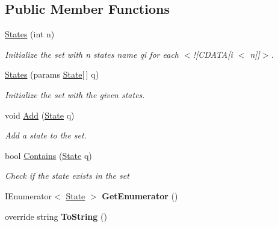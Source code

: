 \subsection*{Public Member Functions}
\begin{DoxyCompactItemize}
\item 
\mbox{\hyperlink{class_system_1_1_automata_1_1_states_a850e135e490c7054d909453e6797ffb7}{States}} (int n)
\begin{DoxyCompactList}\small\item\em Initialize the set with n states name qi for each $<$!\mbox{[}C\+D\+A\+TA\mbox{[}i $<$ n\mbox{]}\mbox{]}$>$. \end{DoxyCompactList}\item 
\mbox{\hyperlink{class_system_1_1_automata_1_1_states_ab1df8e7c0afc82245a5b2138656aad4b}{States}} (params \mbox{\hyperlink{class_system_1_1_automata_1_1_state}{State}}\mbox{[}$\,$\mbox{]} q)
\begin{DoxyCompactList}\small\item\em Initialize the set with the given states. \end{DoxyCompactList}\item 
void \mbox{\hyperlink{class_system_1_1_automata_1_1_states_a78c2fd089c3c3c312531d78171fefe4c}{Add}} (\mbox{\hyperlink{class_system_1_1_automata_1_1_state}{State}} q)
\begin{DoxyCompactList}\small\item\em Add a state to the set. \end{DoxyCompactList}\item 
bool \mbox{\hyperlink{class_system_1_1_automata_1_1_states_abf65a1d2a45b018f3f0a8db86a8f8129}{Contains}} (\mbox{\hyperlink{class_system_1_1_automata_1_1_state}{State}} q)
\begin{DoxyCompactList}\small\item\em Check if the state exists in the set \end{DoxyCompactList}\item 
\mbox{\label{class_system_1_1_automata_1_1_states_a2fc3cdaae9912d177a36c5210f7072c0}} 
I\+Enumerator$<$ \mbox{\hyperlink{class_system_1_1_automata_1_1_state}{State}} $>$ {\bfseries Get\+Enumerator} ()
\item 
\mbox{\label{class_system_1_1_automata_1_1_states_a6e0cbc758819e541f9c89e1060881f66}} 
override string {\bfseries To\+String} ()
\end{DoxyCompactItemize}
